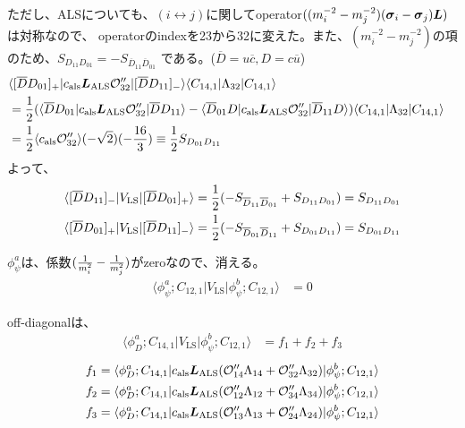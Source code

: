 \documentclass[a4j]{jarticle}
\def\bra{\langle}
\def\ket{\rangle}
\def\calO{{\cal O}}
\def\ubar{\overline{{u}}}
\def\cbar{\overline{{c}}}
\def\Dbar{\overline{{D}}{}}
\newcommand{\xbld}[1]{\mbox{\boldmath $#1$}}
\def\vecL{{\xbld{L}}}
\def\vecsig{{\xbld{\sigma}}}
\def\half#1{\text{${#1\over 2}$}}
\def\Vls{V_\text{LS}}
\def\Lals{{\vecL_\text{ALS}}}
\begin{document}
ただし、ALSについても、$(i\leftrightarrow j)$に関してoperator$((m_i^{-2}-m_j^{-2})(\vecsig_i-\vecsig_j)\vecL)$
は対称なので、
operatorのindexを23から32に変えた。また、$(m_i^{-2}-m_j^{-2})$の項のため、$S_{D_{11}D_{01}}=-S_{\Dbar_{11}\Dbar_{01}}$
である。($\Dbar = u \cbar, D=c\ubar$)
\begin{align}
\lefteqn{\bra [\Dbar D_{01}]_+|c_\text{als}\Lals\calO''_{32}|[\Dbar D_{11}]_-\ket\bra C_{14,1}|\Lambda_{32}|C_{14,1}\ket}
\nonumber\\
&=\half1
(\bra \Dbar D_{01}|c_\text{als}\Lals\calO''_{32}|\Dbar D_{11}\ket-\bra \Dbar_{01} D|c_\text{als}\Lals\calO''_{32}|\Dbar_{11} D\ket)\bra C_{14,1}|\Lambda_{32}|C_{14,1}\ket
\\
&=\half1\bra c_\text{als}\calO''_{32}\ket(-\sqrt{2})(-{16\over 3}) \equiv \half1 S_{D_{01} D_{11}}
\end{align}
%
よって、
\begin{align}
\bra [\Dbar D_{11}]_-|\Vls|[\Dbar D_{01}]_+\ket
&=\half1 (-S_{\Dbar_{11}\Dbar_{01}}+S_{D_{11}D_{01}})=S_{D_{11}D_{01}}
\\
\bra [\Dbar D_{01}]_+|\Vls|[\Dbar D_{11}]_-\ket
&=\half1 (-S_{\Dbar_{01}\Dbar_{11}}+ S_{D_{01}D_{11}})=S_{D_{01}D_{11}}
\end{align}



$\phi_\psi^a$は、係数$({1 \over m_i^2}-{1 \over m_j^2})$がzeroなので、消える。
\begin{align}
\bra \phi_\psi^a;C_{12,1}|\Vls|\phi_\psi^b;C_{12,1}\ket
&=0
\end{align}

off-diagonalは、
\begin{align}
\bra \phi_D^a;C_{14,1}|\Vls|\phi_\psi^b;C_{12,1}\ket&=f_1+f_2+f_3
\end{align}
\begin{align}
f_1&=\bra \phi_D^a;C_{14,1}|c_\text{als}\Lals(\calO''_{14}\Lambda_{14}+\calO''_{32}\Lambda_{32})|\phi_\psi^b;C_{12,1}\ket
\\
f_2&=\bra \phi_D^a;C_{14,1}|c_\text{als}\Lals(\calO''_{12}\Lambda_{12}+\calO''_{34}\Lambda_{34})|\phi_\psi^b;C_{12,1}\ket
\\
f_3&=\bra \phi_D^a;C_{14,1}|c_\text{als}\Lals(\calO''_{13}\Lambda_{13}+\calO''_{24}\Lambda_{24})|\phi_\psi^b;C_{12,1}\ket
\end{align}
\end{document}
